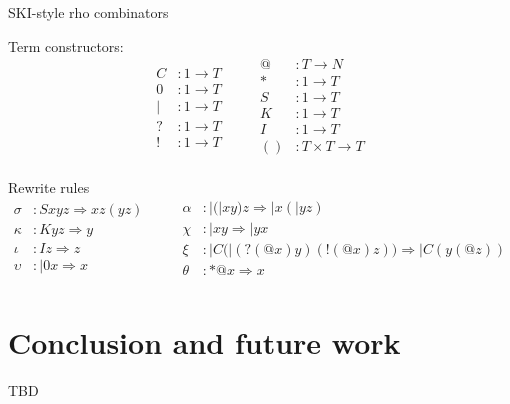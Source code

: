 \documentclass{llncs}
\begin{document}


SKI-style rho combinators


Term constructors:
\[\begin{array}{rl}
  C &: 1 \to T \\
  0 &: 1 \to T \\
  | &: 1 \to T \\
  ? &: 1 \to T \\
  ! &: 1 \to T \\
\end{array} \quad \quad
\begin{array}{rl}
  @ &: T \to N \\
  * &: 1 \to T \\
  S &: 1 \to T \\
  K &: 1 \to T \\
  I &: 1 \to T \\
  () &: T \times T \to T \\
\end{array}\]

Rewrite rules
\[\begin{array}{rl}
  \sigma &: Sxyz \Rightarrow xz(yz) \\
  \kappa &: Kyz \Rightarrow y \\
  \iota &: Iz \Rightarrow z \\
  \upsilon &: |0x \Rightarrow x \\
\end{array} \quad \quad
\begin{array}{rl}
  \alpha &: |(|xy)z \Rightarrow |x(|yz) \\
  \chi &: |xy \Rightarrow |yx \\
  \xi &: |C(|(?(@x)y)(!(@x)z)) \Rightarrow |C(y(@z)) \\
  \theta &: *@x \Rightarrow x \\
\end{array}\]


\section{Conclusion and future work}
TBD



\end{document}
